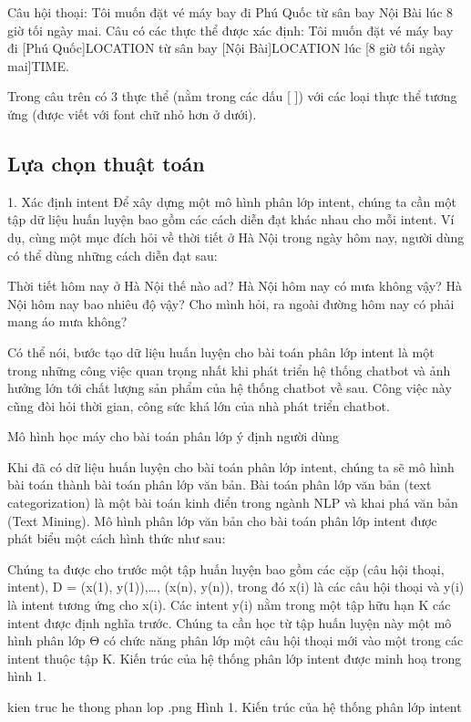Câu hội thoại: Tôi muốn đặt vé máy bay đi Phú Quốc từ sân bay Nội Bài lúc 8 giờ tối ngày mai.
Câu có các thực thể được xác định: Tôi muốn đặt vé máy bay đi [Phú Quốc]LOCATION từ sân bay [Nội Bài]LOCATION lúc [8 giờ tối ngày mai]TIME.

Trong câu trên có 3 thực thể (nằm trong các dấu [ ]) với các loại thực thể tương ứng (được viết với font chữ nhỏ hơn ở dưới).

\subsection{Lựa chọn thuật toán}

1. Xác định intent
Để xây dựng một mô hình phân lớp intent, chúng ta cần một tập dữ liệu huấn luyện bao gồm các cách diễn đạt khác nhau cho mỗi intent. Ví dụ, cùng một mục đích hỏi về thời tiết ở Hà Nội trong ngày hôm nay, người dùng có thể dùng những cách diễn đạt sau:

Thời tiết hôm nay ở Hà Nội thế nào ad?
Hà Nội hôm nay có mưa không vậy?
Hà Nội hôm nay bao nhiêu độ vậy?
Cho mình hỏi, ra ngoài đường hôm nay có phải mang áo mưa không?

Có thể nói, bước tạo dữ liệu huấn luyện cho bài toán phân lớp intent là một trong những công việc quan trọng nhất khi phát triển hệ thống chatbot và ảnh hưởng lớn tới chất lượng sản phẩm của hệ thống chatbot về sau. Công việc này cũng đòi hỏi thời gian, công sức khá lớn của nhà phát triển chatbot.

Mô hình học máy cho bài toán phân lớp ý định người dùng

Khi đã có dữ liệu huấn luyện cho bài toán phân lớp intent, chúng ta sẽ mô hình bài toán thành bài toán phân lớp văn bản. Bài toán phân lớp văn bản (text categorization) là một bài toán kinh điển trong ngành NLP và khai phá văn bản (Text Mining). Mô hình phân lớp văn bản cho bài toán phân lớp intent được phát biểu một cách hình thức như sau:

Chúng ta được cho trước một tập huấn luyện bao gồm các cặp (câu hội thoại, intent), D = {(x(1), y(1)),…, (x(n), y(n))}, trong đó x(i) là các câu hội thoại và y(i) là intent tương ứng cho x(i). Các intent y(i) nằm trong một tập hữu hạn Κ các intent được định nghĩa trước. Chúng ta cần học từ tập huấn luyện này một mô hình phân lớp Θ có chức năng phân lớp một câu hội thoại mới vào một trong các intent thuộc tập K. Kiến trúc của hệ thống phân lớp intent được minh hoạ trong hình 1.

kien truc he thong phan lop .png
Hình 1. Kiến trúc của hệ thống phân lớp intent

